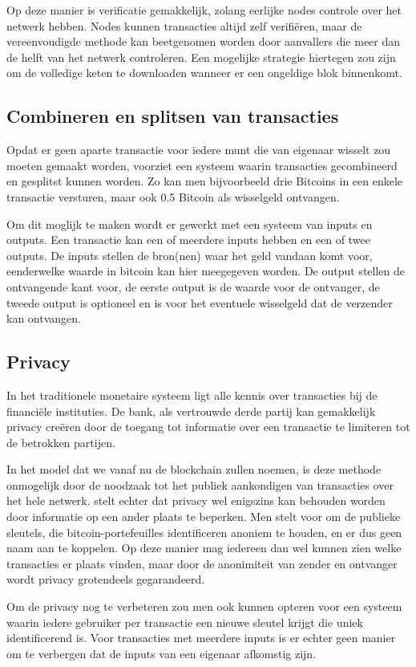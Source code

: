 		Op deze manier is verificatie gemakkelijk, zolang eerlijke nodes controle over het netwerk hebben. Nodes kunnen transacties altijd zelf verifiëren, maar de vereenvoudigde methode kan beetgenomen worden door aanvallers die meer dan de helft van het netwerk controleren. Een mogelijke strategie hiertegen zou zijn om de volledige keten te downloaden wanneer er een ongeldige blok binnenkomt. 
	\subsection{Combineren en splitsen van transacties}
	Opdat er geen aparte transactie voor iedere munt die van eigenaar wisselt zou moeten gemaakt worden, voorziet \textcite{Nakamoto2008} een systeem waarin transacties gecombineerd en gesplitst kunnen worden. Zo kan men bijvoorbeeld drie Bitcoins in een enkele transactie versturen, maar ook 0.5 Bitcoin als wisselgeld ontvangen.
	
	Om dit moglijk te maken wordt er gewerkt met een systeem van inputs en outputs. Een transactie kan een of meerdere inputs hebben en een of twee outputs. De inputs stellen de bron(nen) waar het geld vandaan komt voor, eenderwelke waarde in bitcoin kan hier meegegeven worden. De output stellen de ontvangende kant voor, de eerste output is de waarde voor de ontvanger, de tweede output is optioneel en is voor het eventuele wisselgeld dat de verzender kan ontvangen.
	\subsection{Privacy}
	In het traditionele monetaire systeem ligt alle kennis over transacties bij de financiële instituties. De bank, als vertrouwde derde partij kan gemakkelijk privacy creëren door de toegang tot informatie over een transactie te limiteren tot de betrokken partijen. 
	
	In het model dat we vanaf nu de blockchain zullen noemen, is deze methode onmogelijk door de noodzaak tot het publiek aankondigen van transacties over het hele netwerk.  \textcite{Nakamoto2008} stelt echter dat privacy wel enigszins kan behouden worden door informatie op een ander plaats te beperken. Men stelt voor om de publieke sleutels, die bitcoin-portefeuilles identificeren anoniem te houden, en er dus geen naam aan te koppelen. Op deze manier mag iedereen dan wel kunnen zien welke transacties er plaats vinden, maar door de anonimiteit van zender en ontvanger wordt privacy grotendeels gegarandeerd.
	
	Om de privacy nog te verbeteren zou men ook kunnen opteren voor een systeem waarin iedere gebruiker per transactie een nieuwe sleutel krijgt die uniek identificerend is. Voor transacties met meerdere inputs is er echter geen manier om te verbergen dat de inputs van een eigenaar afkomstig zijn.
